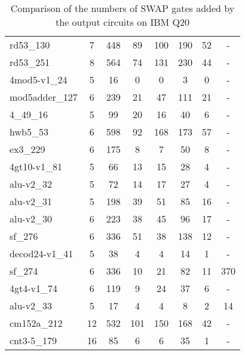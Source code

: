 \documentclass[journal]{IEEEtran}
\begin{document}
\begin{table*}[htbp]
\begin{center}
\begin{tabular}{|p{4.3cm}<{\centering}|c|c|c|c|c|c|c|}
				rd53\_130 & 7 & 448 & 89 & 100 & 190 & 52 & - \\ 
				rd53\_251 & 8 & 564 & 74 & 131 & 230 & 44 & - \\ 
				4mod5-v1\_24 & 5 & 16 & 0 & 0 & 3 & 0 & - \\ 
				mod5adder\_127 & 6 & 239 & 21 & 47 & 111 & 21 & - \\ 
				4\_49\_16 & 5 & 99 & 20 & 16 & 40 & 6 & - \\ 
				hwb5\_53 & 6 & 598 & 92 & 168 & 173 & 57 & - \\ 
				ex3\_229 & 6 & 175 & 8 & 7 & 50 & 8 & - \\ 
				4gt10-v1\_81 & 5 & 66 & 13 & 15 & 28 & 4 & - \\ 
				alu-v2\_32 & 5 & 72 & 14 & 17 & 27 & 4 & - \\ 
				alu-v2\_31 & 5 & 198 & 39 & 51 & 85 & 16 & - \\ 
				alu-v2\_30 & 6 & 223 & 38 & 45 & 96 & 17 & - \\ 
				sf\_276 & 6 & 336 & 51 & 38 & 138 & 12 & - \\ 
				decod24-v1\_41 & 5 & 38 & 4 & 4 & 14 & 1 & - \\ 
				sf\_274 & 6 & 336 & 10 & 21 & 82 & 11 & 370 \\ 
				4gt4-v1\_74 & 6 & 119 & 9 & 24 & 37 & 6 & - \\ 
				alu-v2\_33 & 5 & 17 & 4 & 4 & 8 & 2 & 14 \\ 
				cm152a\_212 & 12 & 532 & 101 & 150 & 168 & 42 & - \\ 
				cnt3-5\_179 & 16 & 85 & 6 & 6 & 35 & 1 & - \\
				\hline
			\end{tabular} 
		\end{center}
		\caption{Comparison of  the numbers of SWAP gates added by the 
			output circuits on  IBM Q20 } 
		\label{tab3}
	\end{table*}
	
\end{document}
